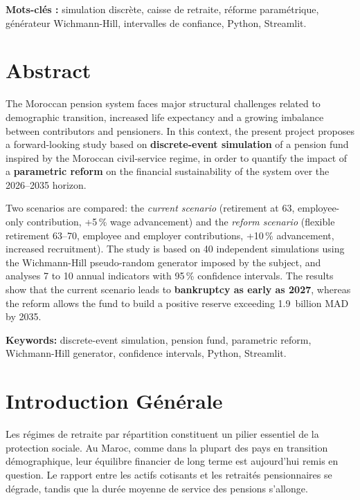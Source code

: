 \documentclass[12pt,a4paper,oneside]{report}
\begin{document}
\textbf{Mots-clés :} simulation discrète, caisse de retraite, réforme
paramétrique, générateur Wichmann-Hill, intervalles de confiance,
Python, Streamlit.

\chapter*{Abstract}

The Moroccan pension system faces major structural challenges related to
demographic transition, increased life expectancy and a growing imbalance
between contributors and pensioners. In this context, the present project
proposes a forward-looking study based on \textbf{discrete-event
simulation} of a pension fund inspired by the Moroccan civil-service
regime, in order to quantify the impact of a \textbf{parametric reform} on
the financial sustainability of the system over the 2026--2035 horizon.

Two scenarios are compared: the \emph{current scenario} (retirement at 63,
employee-only contribution, +5\,\% wage advancement) and the
\emph{reform scenario} (flexible retirement 63--70, employee and employer
contributions, +10\,\% advancement, increased recruitment). The study is
based on 40 independent simulations using the Wichmann-Hill pseudo-random
generator imposed by the subject, and analyses 7 to 10 annual indicators
with 95\,\% confidence intervals. The results show that the current
scenario leads to \textbf{bankruptcy as early as 2027}, whereas the reform
allows the fund to build a positive reserve exceeding 1.9~billion MAD by
2035.

\textbf{Keywords:} discrete-event simulation, pension fund, parametric
reform, Wichmann-Hill generator, confidence intervals, Python, Streamlit.

\tableofcontents
\listoffigures
\listoftables

\chapter*{Introduction Générale}
\setcounter{page}{1}

Les régimes de retraite par répartition constituent un pilier essentiel de
la protection sociale. Au Maroc, comme dans la plupart des pays en
transition démographique, leur équilibre financier de long terme est
aujourd'hui remis en question. Le rapport entre les actifs cotisants et
les retraités pensionnaires se dégrade, tandis que la durée moyenne de
service des pensions s'allonge.
\end{document}
